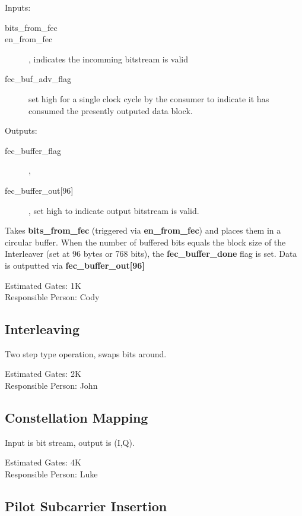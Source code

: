 \documentclass[dvips,10pt,twocolumn]{article}
\begin{document}
		\begin{description}
			\item{Inputs:} \begin{description}
				\item[bits\_from\_fec]
				\item[en\_from\_fec], indicates the incomming
					bitstream is valid
				\item[fec\_buf\_adv\_flag] set high for a
					single clock cycle by the consumer to
					indicate it has consumed the
					presently outputed data block.
			\end{description}
			\item{Outputs:} \begin{description}
				\item[fec\_buffer\_flag], 
				\item[fec\_buffer\_out{[96]}], set high to indicate
					output bitstream is valid.
			\end{description}
		\end{description}

		Takes \textbf{bits\_from\_fec} (triggered via
		\textbf{en\_from\_fec}) and places them in a circular
		buffer. When the number of buffered bits equals the block
		size of the Interleaver (set at 96 bytes or 768 bits), the
		\textbf{fec\_buffer\_done} flag is set. Data is outputted
		via \textbf{fec\_buffer\_out[96]}

		Estimated Gates: 1K \\
		Responsible Person: Cody

	\subsection{Interleaving}
		\label{sec:interleaving}

		Two step type operation, swaps bits around.

		Estimated Gates: 2K \\
		Responsible Person: John

	\subsection{Constellation Mapping}
		\label{sec:constellation}

		Input is bit stream, output is (I,Q).
		
		Estimated Gates: 4K \\
		Responsible Person: Luke

	\subsection{Pilot Subcarrier Insertion}
		\label{sec:pilot}
\end{document}
